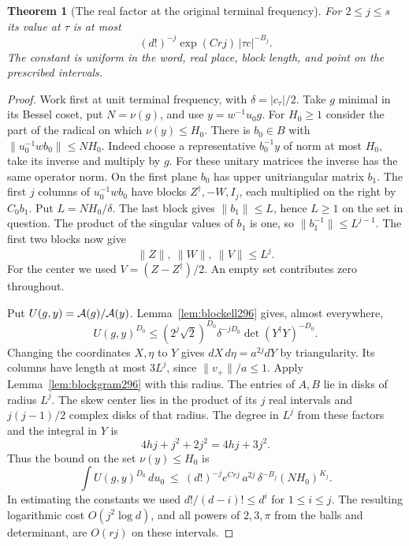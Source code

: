 \documentclass[a4paper,11pt]{article}
\newtheorem{theorem}[proposition]{Theorem}
\theoremstyle{definition}
\theoremstyle{remark}
\numberwithin{equation}{section}
\begin{document}
\begin{theorem}[The real factor at the original terminal frequency]\leavevmode
\label{thm:blockfactorial296}
For \(2\le j\le s\) its value at \(\tau\) is at most
\[
          (d!)^{-j}\exp(Crj)\,|\tau c|^{-B_j}.
\]
The constant is uniform in the word, real place, block length,
and point on the prescribed intervals.
\end{theorem}
\begin{proof}
Work first at unit terminal frequency, with
\(\delta=|c_\tau|/2\). Take \(g\) minimal in its Bessel coset,
put \(N=\nu(g)\), and use \(y=w^{-1}u_0g\). For \(H_0\ge1\)
consider the part of the radical on which \(\nu(y)\le H_0\).
There is \(b_0\in B\) with \(\|u_0^{-1}wb_0\|\le NH_0\).
Indeed choose a representative \(b_0^{-1}y\) of norm at most
\(H_0\), take its inverse and multiply by \(g\). For these
unitary matrices the inverse has the same operator norm.
On the first plane \(b_0\) has upper unitriangular matrix
\(b_1\). The first \(j\) columns of \(u_0^{-1}wb_0\) have
blocks \(Z^\dagger,-W,I_j\), each multiplied on the right by
\(C_0 b_1\). Put \(L=NH_0/\delta\). The last block gives
\(\|b_1\|\le L\), hence \(L\ge1\) on the set in question.
The product of the singular values of \(b_1\) is one, so
\(\|b_1^{-1}\|\le L^{j-1}\). The first two blocks now give
\[
                   \|Z\|,\ \|W\|,\ \|V\|\le L^j .
\]
For the center we used \(V=(Z-Z^\dagger)/2\). An empty set
contributes zero throughout.

Put \(U(g,y)={\cal A}(g)/{\cal A}(y)\).
Lemma~\ref{lem:blockell296} gives, almost everywhere,
\[
 U(g,y)^{D_0}\le(2^j\sqrt{2})^{D_0}\delta^{-jD_0}
                                     \det(Y^\dagger Y)^{-D_0}.
\]
Changing the coordinates \(X,\eta\) to \(Y\) gives
\(dX\,d\eta=a^{2j}dY\) by triangularity. Its columns have
length at most \(3L^j\), since \(\|v_+\|/a\le1\).
Apply Lemma~\ref{lem:blockgram296} with this radius.
The entries of \(A,B\) lie in disks of radius \(L^j\).
The skew center lies in the product of its \(j\) real
intervals and \(j(j-1)/2\) complex disks of that radius.
The degree in \(L^j\) from these factors and the integral in
\(Y\) is
\[
                4hj+j^2+2j^2=4hj+3j^2 .
\]
Thus the bound on the set \(\nu(y)\le H_0\) is
\[
 \int U(g,y)^{D_0}\,du_0
 \ \le\ (d!)^{-j}e^{Crj}\,a^{2j}\,
             \delta^{-B_j}(NH_0)^{K_j}.
\]
In estimating the constants we used \(d!/(d-i)!\le d^i\)
for \(1\le i\le j\). The resulting logarithmic cost
\(O(j^2\log d)\), and all powers of \(2,3,\pi\) from the
balls and determinant, are \(O(rj)\) on these intervals.


\end{proof}
\end{document}
